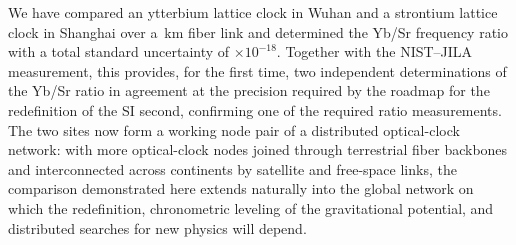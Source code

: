We have compared an ytterbium lattice clock in Wuhan and a strontium
lattice clock in Shanghai over a \fibreKm\,km fiber link and
determined the Yb/Sr frequency ratio with a total standard
uncertainty of \uTotalE$\times10^{-18}$. Together with the NIST--JILA
measurement, this provides, for the first time, two independent
determinations of the Yb/Sr ratio in agreement at the precision
required by the roadmap for the redefinition of the SI second,
confirming one of the required ratio measurements. The two sites now
form a working node pair of a distributed optical-clock network: with
more optical-clock nodes joined through terrestrial fiber backbones
and interconnected across continents by satellite and free-space
links, the comparison demonstrated here extends naturally into the
global network on which the redefinition, chronometric leveling of
the gravitational potential, and distributed searches for new physics
will depend.
